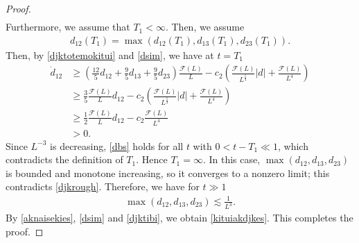 \documentclass[reqno]{amsart}
\theoremstyle{plain}
\theoremstyle{definition}
\numberwithin{equation}{section}
\newcommand{\1}{\mathbbm{1}}
\begin{document}
\begin{proof}
\begin{align}
\end{align}
Furthermore, we assume that $T_1<\infty$. Then, we assume
\begin{align*}
d_{12}(T_1)=\max{(d_{12}(T_1),d_{13}(T_1),d_{23}(T_1))}.
\end{align*}
Then, by \eqref{djktotemokitui} and \eqref{dsim}, we have at $t=T_1$
\begin{align*}
\dot{d}_{12}&\geq \left(\frac{12}{5}d_{12}+\frac{9}{5}d_{13}+\frac{9}{5}d_{23}\right)\frac{\mathcal{F}(L)}{L}- c_2\left(\frac{\mathcal{F}(L)}{L^{\frac{5}{4}}}|d|+\frac{\mathcal{F}(L)}{L^4}\right)
\\
&\geq \frac{3}{5}\frac{\mathcal{F}(L)}{L}d_{12}- c_2\left(\frac{\mathcal{F}(L)}{L^{\frac{5}{4}}}|d|+\frac{\mathcal{F}(L)}{L^4}\right)
\\
&\geq \frac{1}{2}\frac{\mathcal{F}(L)}{L}d_{12}-c_2\frac{\mathcal{F}(L)}{L^4}
\\
&>0.
\end{align*}
Since $L^{-3}$ is decreasing, \eqref{dbs} holds for all $t$ with $0<t-T_1\ll 1$, which contradicts the definition of $T_1$. Hence $T_1=\infty$. In this case, $\max{(d_{12},d_{13},d_{23})}$ is bounded and monotone increasing, so it converges to a nonzero limit; this contradicts \eqref{djkrough}. Therefore, we have for $t\gg 1$
\begin{align}\label{djktibi}
\max{(d_{12},d_{13},d_{23})}\lesssim \frac{1}{L^3}.
\end{align}
By \eqref{aknaisekies}, \eqref{dsim} and \eqref{djktibi}, we obtain \eqref{kituiakdjkes}. This completes the proof.

\end{proof}
\end{document}
